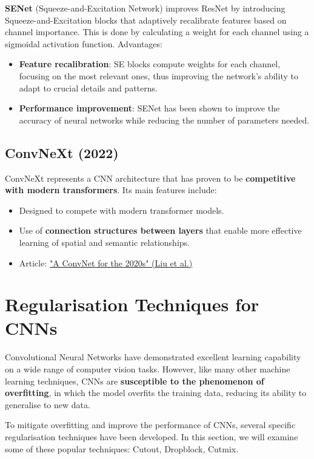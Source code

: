 \textbf{SENet} (Squeeze-and-Excitation Network) improves ResNet by introducing Squeeze-and-Excitation blocks that adaptively recalibrate features based on channel importance. This is done by calculating a weight for each channel using a sigmoidal activation function. Advantages:
\begin{itemize}
    \item \textbf{Feature recalibration}: SE blocks compute weights for each channel, focusing on the most relevant ones, thus improving the network's ability to adapt to crucial details and patterns.
    \item \textbf{Performance improvement}: SENet has been shown to improve the accuracy of neural networks while reducing the number of parameters needed.
\end{itemize}

\subsection{ConvNeXt (2022)}
ConvNeXt represents a CNN architecture that has proven to be \textbf{competitive with modern transformers}. Its main features include:
\begin{itemize}
    \item Designed to compete with modern transformer models.
    \item Use of \textbf{connection structures between layers} that enable more effective learning of spatial and semantic relationships.
    \item Article: \href{https://arxiv.org/pdf/2201.03545.pdf}{"A ConvNet for the 2020s" (Liu et al.)}
\end{itemize}


\section{Regularisation Techniques for CNNs}
Convolutional Neural Networks have demonstrated excellent learning capability on a wide range of computer vision tasks. However, like many other machine learning techniques, CNNs are \textbf{susceptible to the phenomenon of overfitting}, in which the model overfits the training data, reducing its ability to generalise to new data.

To mitigate overfitting and improve the performance of CNNs, several specific regularisation techniques have been developed. In this section, we will examine some of these popular techniques: Cutout, Dropblock, Cutmix.

